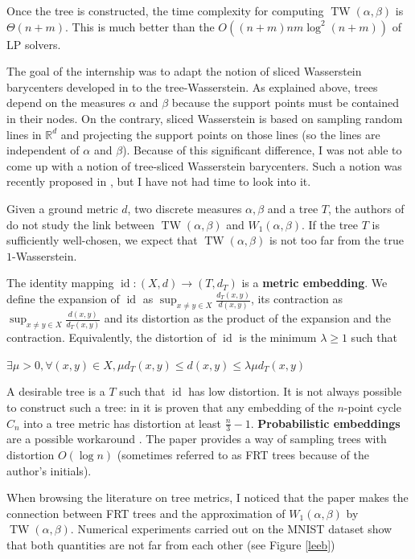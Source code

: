 \documentclass[12pt]{report}
\theoremstyle{definition}
\theoremstyle{remark}
\DeclareMathOperator{\tw}{TW}
\DeclareMathOperator*{\id}{id}
\begin{document}
Once the tree is constructed, the time complexity for computing $\tw(\alpha,\beta)$ is $\Theta(n+m)$. This is much better than the $O((n+m)nm \log^2(n+m))$ of LP solvers.
\\
\par The goal of the internship was to adapt the notion of sliced Wasserstein barycenters developed in \cite{bonneel2015sliced} to the tree-Wasserstein. As explained above, trees depend on the measures $\alpha$ and $\beta$ because the support points must be contained in their nodes. On the contrary, sliced Wasserstein is based on sampling random lines in $\mathbb R^d$ and projecting the support points on those lines (so the lines are independent of $\alpha$ and $\beta$). Because of this significant difference, I was not able to come up with a notion of tree-sliced Wasserstein barycenters. Such a notion was recently proposed in \cite{le2019scalable}, but I have not had time to look into it.
\\
\par Given a ground metric $d$, two discrete measures $\alpha, \beta$ and a tree $T$, the authors of \cite{le2019tree} do not study the link between $\tw(\alpha,\beta)$ and $W_1(\alpha,\beta)$. If the tree $T$ is sufficiently well-chosen, we expect that $\tw(\alpha,\beta)$ is not too far from the true $1$-Wasserstein.
\par The identity mapping $\id: (X,d)\to (T,d_T)$ is a \textbf{metric embedding}. We define the expansion of $\id$ as $\sup_{x\neq y\in X} \frac{d_T(x,y)}{d(x,y)}$, its contraction as $\sup_{x\neq y\in X} \frac{d(x,y)}{d_T(x,y)}$ and its distortion as the product of the expansion and the contraction. Equivalently, the distortion of $\id$ is the minimum $\lambda\geq 1$ such that \begin{center}
	$\exists\mu>0, \forall (x,y)\in X, \mu d_T(x,y)\leq d(x,y) \leq \lambda \mu d_T(x,y)$
\end{center}
A desirable tree is a $T$ such that $\id$ has low distortion. It is not always possible to construct such a tree: in \cite{rabinovich1998lower} it is proven that any embedding of the $n$-point cycle $C_n$ into a tree metric has distortion at least $\frac n3 -1$. \textbf{Probabilistic embeddings} are a possible workaround \cite{Bartal19}. The paper \cite{fakcharoenphol2004tight} provides a way of sampling trees with distortion $O(\log n)$ (sometimes referred to as FRT trees because of the author's initials).
\par When browsing the literature on tree metrics, I noticed that the paper \cite{leeb2018approximating} makes the connection between FRT trees and the approximation of $W_1(\alpha,\beta)$ by $\tw(\alpha,\beta)$. Numerical experiments carried out on the MNIST dataset show that both quantities are not far from each other (see Figure \ref{leeb})
\end{document}
